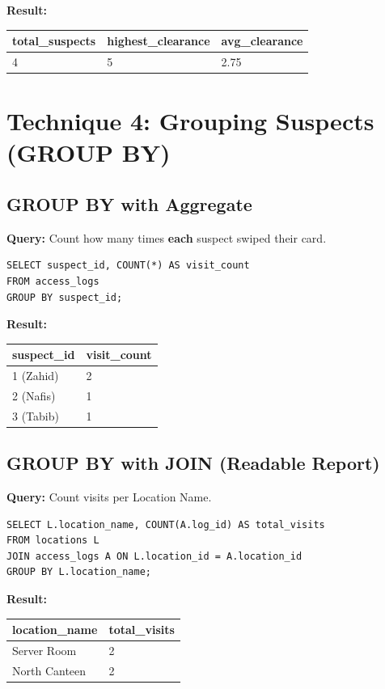 \documentclass[12pt,a4paper]{article}
\begin{document}
\textbf{Result:}
\begin{table}[H]
\centering
\begin{tabular}{@{}lll@{}}
\toprule
\textbf{total\_suspects} & \textbf{highest\_clearance} & \textbf{avg\_clearance} \\ \midrule
4 & 5 & 2.75 \\ \bottomrule
\end{tabular}
\end{table}

\section{Technique 4: Grouping Suspects (GROUP BY)}

\subsection{GROUP BY with Aggregate}
\textbf{Query:} Count how many times \textbf{each} suspect swiped their card.
\begin{lstlisting}
SELECT suspect_id, COUNT(*) AS visit_count
FROM access_logs
GROUP BY suspect_id;
\end{lstlisting}

\textbf{Result:}
\begin{table}[H]
\centering
\begin{tabular}{@{}ll@{}}
\toprule
\textbf{suspect\_id} & \textbf{visit\_count} \\ \midrule
1 (Zahid) & 2 \\
2 (Nafis) & 1 \\
3 (Tabib) & 1 \\ \bottomrule
\end{tabular}
\end{table}

\subsection{GROUP BY with JOIN (Readable Report)}
\textbf{Query:} Count visits per Location Name.
\begin{lstlisting}
SELECT L.location_name, COUNT(A.log_id) AS total_visits
FROM locations L
JOIN access_logs A ON L.location_id = A.location_id
GROUP BY L.location_name;
\end{lstlisting}

\textbf{Result:}
\begin{table}[H]
\centering
\begin{tabular}{@{}ll@{}}
\toprule
\textbf{location\_name} & \textbf{total\_visits} \\ \midrule
Server Room & 2 \\
North Canteen & 2 \\ \bottomrule
\end{tabular}
\end{table}
\end{document}
